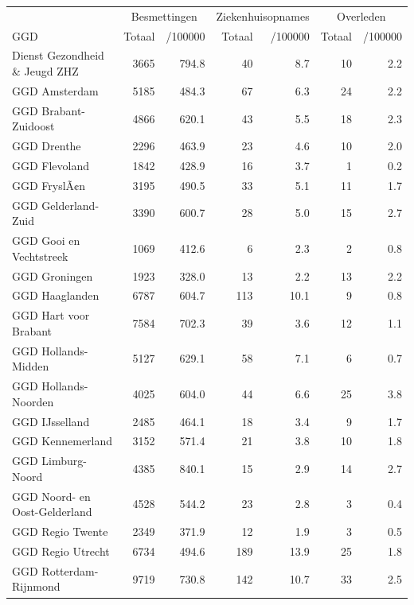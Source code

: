 \documentclass[
  english,
  man,floatsintext]{apa6}
\begin{document}
\begin{table}
\centering\begingroup\fontsize{10}{12}\selectfont

\begin{threeparttable}
\begin{tabular}{lrrrrrr}
\toprule
\multicolumn{1}{c}{ } & \multicolumn{2}{c}{Besmettingen} & \multicolumn{2}{c}{Ziekenhuisopnames} & \multicolumn{2}{c}{Overleden} \\
\cmidrule(l{3pt}r{3pt}){2-3} \cmidrule(l{3pt}r{3pt}){4-5} \cmidrule(l{3pt}r{3pt}){6-7}
GGD & Totaal & /100000 & Totaal & /100000 & Totaal & /100000\\
\midrule
Dienst Gezondheid \& Jeugd ZHZ & 3665 & 794.8 & 40 & 8.7 & 10 & 2.2\\
GGD Amsterdam & 5185 & 484.3 & 67 & 6.3 & 24 & 2.2\\
GGD Brabant-Zuidoost & 4866 & 620.1 & 43 & 5.5 & 18 & 2.3\\
GGD Drenthe & 2296 & 463.9 & 23 & 4.6 & 10 & 2.0\\
GGD Flevoland & 1842 & 428.9 & 16 & 3.7 & 1 & 0.2\\
GGD FryslÃ¢n & 3195 & 490.5 & 33 & 5.1 & 11 & 1.7\\
GGD Gelderland-Zuid & 3390 & 600.7 & 28 & 5.0 & 15 & 2.7\\
GGD Gooi en Vechtstreek & 1069 & 412.6 & 6 & 2.3 & 2 & 0.8\\
GGD Groningen & 1923 & 328.0 & 13 & 2.2 & 13 & 2.2\\
GGD Haaglanden & 6787 & 604.7 & 113 & 10.1 & 9 & 0.8\\
GGD Hart voor Brabant & 7584 & 702.3 & 39 & 3.6 & 12 & 1.1\\
GGD Hollands-Midden & 5127 & 629.1 & 58 & 7.1 & 6 & 0.7\\
GGD Hollands-Noorden & 4025 & 604.0 & 44 & 6.6 & 25 & 3.8\\
GGD IJsselland & 2485 & 464.1 & 18 & 3.4 & 9 & 1.7\\
GGD Kennemerland & 3152 & 571.4 & 21 & 3.8 & 10 & 1.8\\
GGD Limburg-Noord & 4385 & 840.1 & 15 & 2.9 & 14 & 2.7\\
GGD Noord- en Oost-Gelderland & 4528 & 544.2 & 23 & 2.8 & 3 & 0.4\\
GGD Regio Twente & 2349 & 371.9 & 12 & 1.9 & 3 & 0.5\\
GGD Regio Utrecht & 6734 & 494.6 & 189 & 13.9 & 25 & 1.8\\
GGD Rotterdam-Rijnmond & 9719 & 730.8 & 142 & 10.7 & 33 & 2.5\\

\end{tabular}
\end{threeparttable}
\end{table}
\end{document}
